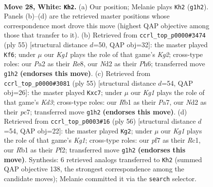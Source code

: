 \documentclass[11pt]{article}
\begin{document}
\clearpage

\begin{figure}[p]\centering
\begin{subfigure}{0.46\textwidth}\centering
\resizebox{\linewidth}{!}{%
\newchessgame
\chessboard[
  setfen={6r1/1b3pk1/2p3p1/p1P2r1p/BP5P/8/P2N2P1/1RB3K1 w - - 0 28},
  showmover=false,
  pgfstyle=straightmove, color=movearrow, markmove={g1-h2}
]}
\caption{}
\end{subfigure}\hfill
\begin{subfigure}{0.46\textwidth}\centering
\resizebox{\linewidth}{!}{%
\newchessgame
\chessboard[
  setfen={3rr3/1p4k1/2p1b1pp/4p3/2P1B1P1/1P2R2P/5PK1/4R3 b - - 1 28},
  showmover=false,
  pgfstyle=straightmove, color=movearrow, markmove={g7-f6}
]}
\caption{}
\end{subfigure}
\\[4pt]
\begin{subfigure}{0.46\textwidth}\centering
\resizebox{\linewidth}{!}{%
\newchessgame
\chessboard[
  setfen={8/p1P3pp/b2k4/2pr1p2/5P2/1P4P1/PK2p2P/2R1R3 b - - 0 28},
  showmover=false,
  pgfstyle=straightmove, color=movearrow, markmove={d6-c7}
]}
\caption{}
\end{subfigure}\hfill
\begin{subfigure}{0.46\textwidth}\centering
\resizebox{\linewidth}{!}{%
\newchessgame
\chessboard[
  setfen={6k1/rrp2ppp/3p2b1/3P4/2R5/1B6/PP3P1P/2R3K1 w - - 3 29},
  showmover=false,
  pgfstyle=straightmove, color=movearrow, markmove={g1-g2}
]}
\caption{}
\end{subfigure}
\caption{\textbf{Move 28, White: \texttt{Kh2}.} (a) Our position; Melanie plays \texttt{Kh2} (\texttt{g1h2}). Panels (b)--(d) are the retrieved master positions whose correspondence most drove this move (highest QAP objective among those that transfer to it). (b) Retrieved from \texttt{ccrl\_top\_p0000\#3474} (ply 55) [structural distance $d$=50, QAP obj=32]: the master played \texttt{Kf6}; under $\mu$ our \emph{Kg1} plays the role of that game's \emph{Kg2}; cross-type roles: our \emph{P}a2 as their \emph{R}e8, our \emph{N}d2 as their \emph{P}h6; transferred move \texttt{g1h2} \textbf{(endorses this move)}. (c) Retrieved from \texttt{ccrl\_top\_p0000\#3081} (ply 55) [structural distance $d$=54, QAP obj=26]: the master played \texttt{Kxc7}; under $\mu$ our \emph{Kg1} plays the role of that game's \emph{Kd3}; cross-type roles: our \emph{R}b1 as their \emph{P}a7, our \emph{N}d2 as their \emph{p}c7; transferred move \texttt{g1h2} \textbf{(endorses this move)}. (d) Retrieved from \texttt{ccrl\_top\_p0003\#16} (ply 56) [structural distance $d$=54, QAP obj=22]: the master played \texttt{Kg2}; under $\mu$ our \emph{Kg1} plays the role of that game's \emph{Kg1}; cross-type roles: our \emph{p}f7 as their \emph{R}c1, our \emph{R}b1 as their \emph{P}f2; transferred move \texttt{g1h2} \textbf{(endorses this move)}. Synthesis: 6 retrieved analogs transferred to \texttt{Kh2} (summed QAP objective 138, the strongest correspondence among the candidate moves); Melanie committed it via the \texttt{search} selector.}
\label{fig:thought-m54}
\end{figure}
\end{document}
